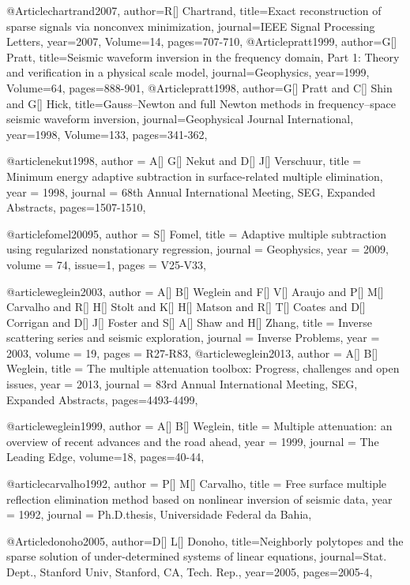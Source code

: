@Article{chartrand2007,
  author={R[] Chartrand},
  title={Exact reconstruction of sparse signals via nonconvex minimization},
  journal={IEEE Signal Processing Letters},
  year=2007,
  Volume=14,
  pages={707-710},
}
@Article{pratt1999,
  author={G[] Pratt},
  title={Seismic waveform inversion in the frequency domain, Part 1: Theory and verification in a physical scale model},
  journal={Geophysics},
  year=1999,
  Volume=64,
  pages={888-901},
}
@Article{pratt1998,
  author={G[] Pratt and C[] Shin and G[] Hick},
  title={Gauss–Newton and full Newton methods in frequency–space seismic waveform inversion},
  journal={Geophysical Journal International},
  year=1998,
  Volume=133,
  pages={341-362},
}

@article{nekut1998,
  author =	 {A[] G[] Nekut and D[] J[] Verschuur},
  title =	 {Minimum energy adaptive subtraction in surface-related multiple elimination},
  year =	 1998,
  journal =	 {68th Annual International Meeting, SEG, Expanded Abstracts},
 pages=1507-1510,
}

@article{fomel20095,
  author =	 {S[] Fomel},
  title =	 {Adaptive multiple subtraction using regularized nonstationary regression},
  journal = 	 {Geophysics},
  year = 	 2009,
  volume =	 74,
  issue=1,
  pages =	 {V25-V33},
}

@article{weglein2003,
  author =	 {A[] B[] Weglein and F[] V[] Araujo and P[] M[] Carvalho and R[] H[] Stolt and K[] H[] Matson and R[] T[] Coates and D[] Corrigan and D[] J[] Foster and S[] A[] Shaw and H[] Zhang},
  title =	 {Inverse scattering series and seismic exploration},
  journal = 	 {Inverse Problems},
  year = 	 2003,
  volume =	 19,
  pages =	 {R27-R83},
}
@article{weglein2013,
  author =	 {A[] B[] Weglein},
  title =	 {The multiple attenuation toolbox: Progress, challenges and open issues},
  year =	 2013,
  journal =	 {83rd Annual International Meeting, SEG, Expanded Abstracts},
 pages=4493-4499,
}

@article{weglein1999,
  author =	 {A[] B[] Weglein},
  title =	 {Multiple attenuation: an overview of recent advances and the road ahead},
  year =	 1999,
  journal =	 {The Leading Edge},
  volume=18,
 pages=40-44,
}

@article{carvalho1992,
  author =	 {P[] M[] Carvalho},
  title =	 {Free surface multiple reflection elimination method based on nonlinear inversion of seismic data},
  year =	 1992,
  journal =	 {Ph.D.thesis, Universidade Federal da Bahia},
}

@Article{donoho2005,
  author={D[] L[] Donoho},
  title={Neighborly polytopes and the sparse solution of under-determined systems of linear equations},
  journal={Stat. Dept., Stanford Univ, Stanford, CA, Tech. Rep.},
  year=2005,
  pages={2005-4},
}

